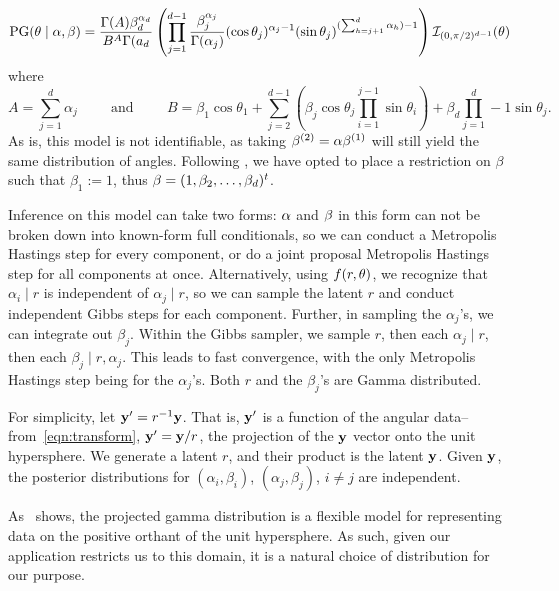 \begin{equation}
    \text{PG}({\bf \theta}\mid{\bf \alpha},{\bf \beta}) = \frac{\Gamma(A)\beta_d^{\alpha_d}}{B^A\Gamma(a_d}\left(\prod_{j = 1}^{d-1}\frac{\beta_j^{\alpha_j}}{\Gamma(\alpha_j)}(\cos\theta_j)^{\alpha_j - 1}(\sin\theta_j)^{(\sum_{h = j + 1}^d\alpha_h) - 1}\right)\mathcal{I}_{(0,\pi/2)^{d-1}}({\bf \theta})
\end{equation}
where
\begin{equation}
    A = \sum_{j = 1}^d\alpha_j \hspace{1cm}\text{and}\hspace{1cm}B = \beta_1\cos\theta_1 + \sum_{j = 2}^{d-1}\left(\beta_j\cos\theta_j\prod_{i = 1}^{j-1}\sin\theta_i\right) + \beta_d\prod_{j = 1}^d-1\sin\theta_j.
\end{equation}
As is, this model is not identifiable, as taking
  ${\bf \beta}^{(2)} = \alpha {\bf \beta}^{(1)}$ will still yield the same
  distribution of angles. Following \cite{nunez2019}, we have opted to place a
  restriction on $\beta$ such that $\beta_1 := 1$, thus
  ${\bf \beta} = (1, \beta_2, \ldots, \beta_d)^t$.

Inference on this model can take two forms: ${\bf \alpha}$ and ${\bf \beta}$ in
  this form can not be broken down into known-form full conditionals, so we can
  conduct a Metropolis Hastings step for every component, or do a joint proposal
  Metropolis Hastings step for all components at once.  Alternatively, using
  $f(r,{\bf \theta})$, we recognize that $\alpha_i\mid r$ is independent of
  $\alpha_j\mid r$, so we can sample the latent $r$ and conduct independent
  Gibbs steps for each component.  Further, in sampling the $\alpha_j$'s, we can
  integrate out $\beta_j$. Within the Gibbs sampler, we sample $r$, then each
  $\alpha_j\mid r$, then each $\beta_j\mid r, \alpha_j$.  This leads to fast
  convergence, with the only Metropolis Hastings step being for the
  $\alpha_j$'s.  Both $r$ and the $\beta_j$'s are Gamma distributed.

For simplicity, let ${\bf y^{\prime}} = r^{-1}{\bf y}$.  That is,
  ${\bf y^{\prime}}$ is a function of the angular data--from~\eqref{eqn:transform},
  ${\bf y^{\prime}} = {\bf y}/r$, the projection of the ${\bf y}$ vector onto
  the unit hypersphere. We generate a latent $r$, and their product is the
  latent ${\bf y}$.  Given ${\bf y}$, the posterior distributions for
  $(\alpha_i, \beta_i)$, $(\alpha_j,\beta_j)$, $i\neq j$ are independent.

As~\cite{nunez2019} shows, the projected gamma distribution is a flexible model
  for representing data on the positive orthant of the unit hypersphere.  As such,
  given our application restricts us to this domain, it is a natural choice of
  distribution for our purpose.

